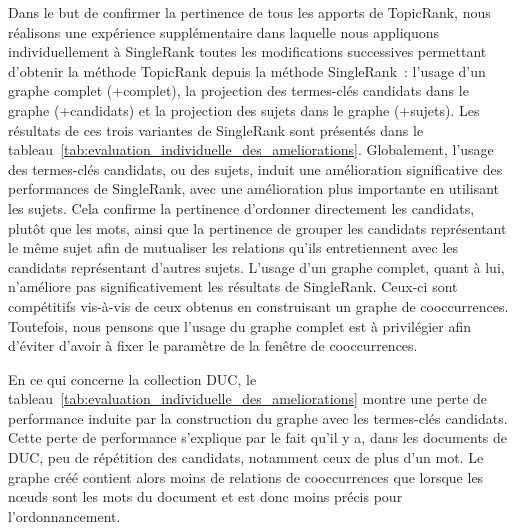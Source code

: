     Dans le but de confirmer la pertinence de tous les apports de TopicRank,
    nous réalisons une expérience supplémentaire dans laquelle nous appliquons
    individuellement à SingleRank toutes les modifications successives
    permettant d'obtenir la méthode TopicRank depuis la méthode SingleRank~:
    l'usage d'un graphe complet (+complet), la projection des termes-clés
    candidats dans le graphe (+candidats) et la projection des sujets dans le
    graphe (+sujets). Les résultats de ces trois variantes de SingleRank sont
    présentés dans le
    tableau~\ref{tab:evaluation_individuelle_des_ameliorations}. Globalement,
    l'usage des termes-clés candidats, ou des sujets, induit une amélioration
    significative des performances de SingleRank, avec une amélioration plus
    importante en utilisant les sujets. Cela confirme la pertinence d'ordonner
    directement les candidats, plutôt que les mots, ainsi que la pertinence de
    grouper les candidats représentant le même sujet afin de mutualiser les
    relations qu'ils entretiennent avec les candidats représentant d'autres
    sujets. L'usage d'un graphe complet, quant à lui, n'améliore pas
    significativement les résultats de SingleRank. Ceux-ci sont compétitifs
    vis-à-vis de ceux obtenus en construisant un graphe de cooccurrences.
    Toutefois, nous pensons que l'usage du graphe complet est à privilégier afin
    d'éviter d'avoir à fixer le paramètre de la fenêtre de cooccurrences.
    
    En ce qui concerne la collection DUC, le
    tableau~\ref{tab:evaluation_individuelle_des_ameliorations} montre une perte
    de performance induite par la construction du graphe avec les termes-clés
    candidats. Cette perte de performance s'explique par le fait qu'il y a, dans
    les documents de DUC, peu de répétition des candidats, notamment ceux de
    plus d'un mot. Le graphe créé contient alors moins de relations de
    cooccurrences que lorsque les n\oe{}uds sont les mots du document et est
    donc moins précis pour l'ordonnancement.

